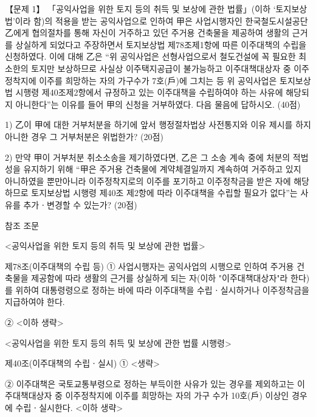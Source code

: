\begin{longquestion}{【문제 1】}
「공익사업을 위한 토지 등의 취득 및 보상에 관한 법률」(이하 ‘토지보상법’이라 함)의 적용을 받는 공익사업으로 인하여 甲은 사업시행자인 한국철도시설공단 乙에게 협의절차를 통해 자신이 거주하고 있던 주거용 건축물을 제공하여 생활의 근거를 상실하게 되었다고 주장하면서 토지보상법 제78조제1항에 따른 이주대책의 수립을 신청하였다. 이에 대해 乙은 “위 공익사업은 선형사업으로서 철도건설에 꼭 필요한 최소한의 토지만 보상하므로 사실상 이주택지공급이 불가능하고 이주대책대상자 중 이주정착지에 이주를 희망하는 자의 가구수가 7호(戶)에 그치는 등 위 공익사업은 토지보상법 시행령 제40조제2항에서 규정하고 있는 이주대책을 수립하여야 하는 사유에 해당되지 아니한다”는 이유를 들어 甲의 신청을 거부하였다. 다음 물음에 답하시오. (40점) \par
1) 乙이 甲에 대한 거부처분을 하기에 앞서 행정절차법상 사전통지와 이유 제시를 하지 아니한 경우 그 거부처분은 위법한가? (20점) \par
2) 만약 甲이 거부처분 취소소송을 제기하였다면, 乙은 그 소송 계속 중에 처분의 적법성을 유지하기 위해 “甲은 주거용 건축물에 계약체결일까지 계속하여 거주하고 있지 아니하였을 뿐만아니라 이주정착지로의 이주를 포기하고 이주정착금을 받은 자에 해당하므로 토지보상법 시행령 제40조 제2항에 따라 이주대책을 수립할 필요가 없다”는 사유를 추가ㆍ변경할 수 있는가? (20점) \par
\begin{framedtext}
참조 조문 \par
<공익사업을 위한 토지 등의 취득 및 보상에 관한 법률> \par
제78조(이주대책의 수립 등) ① 사업시행자는 공익사업의 시행으로 인하여 주거용 건축물을 제공함에 따라 생활의 근거를 상실하게 되는 자(이하 "이주대책대상자"라 한다)를 위하여 대통령령으로 정하는 바에 따라 이주대책을 수립ㆍ실시하거나 이주정착금을 지급하여야 한다. \par
② <이하 생략> \par
<공익사업을 위한 토지 등의 취득 및 보상에 관한 법률 시행령> \par
제40조(이주대책의 수립ㆍ실시) ① <생략> \par
② 이주대책은 국토교통부령으로 정하는 부득이한 사유가 있는 경우를 제외하고는 이주대책대상자 중 이주정착지에 이주를 희망하는 자의 가구 수가 10호(戶) 이상인 경우에 수립ㆍ실시한다. <이하 생략> \par

\end{framedtext}
\end{longquestion}
